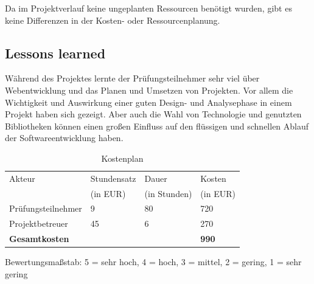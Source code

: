 \documentclass[11pt]{article}
\begin{document}
Da im Projektverlauf keine ungeplanten Ressourcen benötigt wurden, gibt es keine Differenzen in der Kosten- oder
Ressourcenplanung.


\subsection{Lessons learned}

Während des Projektes lernte der Prüfungsteilnehmer sehr viel über Webentwicklung und das Planen und Umsetzen von Projekten.
Vor allem die Wichtigkeit und Auswirkung einer guten Design- und Analysephase in einem Projekt haben sich gezeigt.
Aber auch die Wahl von Technologie und genutzten Bibliotheken können einen großen Einfluss auf den flüssigen und schnellen
Ablauf der Softwareentwicklung haben.

\clearpage
\printglossaries

\clearpage
\listoftables
\listoffigures
{}
\lstlistoflistings
\newpage

\begin{table}[H]
    \centering
    \begin{tabular}{|l|l|l|l|}
        \hline
        Akteur & Stundensatz & Dauer & Kosten \\
        & (in EUR) & (in Stunden) & (in EUR) \\
        \hline
        Prüfungsteilnehmer & 9 & 80 & 720 \\
        Projektbetreuer & 45 & 6 & 270 \\
        \hline
        \textbf{Gesamtkosten} &&& \textbf{990} \\
        \hline
        
    \end{tabular}
    \caption{Kostenplan}
    \label{table:costs}
\end{table}

\begin{table}[H]
    Bewertungsmaßstab: 5 = sehr hoch, 4 = hoch, 3 = mittel, 2 = gering, 1 = sehr gering
    \caption{Nutzwertanalyse}
    \label{table:weightedsum}
\end{table}
\end{document}
